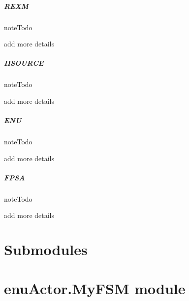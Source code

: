 \documentclass[letterpaper,10pt,english]{sphinxmanual}
\begin{document}
\subparagraph{REXM}
\label{enuActor.Devices:rexm}
\begin{notice}{note}{Todo}

add more details
\end{notice}


\subparagraph{IISOURCE}
\label{enuActor.Devices:iisource}
\begin{notice}{note}{Todo}

add more details
\end{notice}


\subparagraph{ENU}
\label{enuActor.Devices:enu}
\begin{notice}{note}{Todo}

add more details
\end{notice}


\subparagraph{FPSA}
\label{enuActor.Devices:fpsa}
\begin{notice}{note}{Todo}

add more details
\end{notice}


\section{Submodules}
\label{enuActor:submodules}

\section{enuActor.MyFSM module}
\label{enuActor:module-enuActor.MyFSM}\label{enuActor:enuactor-myfsm-module}
\end{document}
